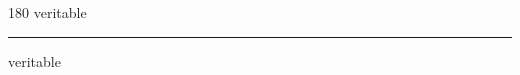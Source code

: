 
\begin{frame}
\begin{center}
\begin{turn}{180}
{\fontsize{2.5cm}{1em}\selectfont veritable}
\end{turn}
\vspace{1em}\par  
\hrule
\vspace{1em}\par  
{\fontsize{2.5cm}{1em}\selectfont veritable}
\end{center}
\end{frame}
